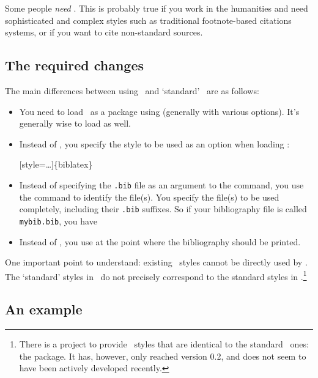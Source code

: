 Some people \emph{need} \biblatex. This is probably true if you work in the humanities and need sophisticated and complex styles such as traditional footnote-based citations systems, or if you want to cite non-standard sources.

\subsection{The required changes}

The main differences between using \biblatex\ and `standard' \bibtex\ are as follows:

\begin{itemize}
\item You need to load \biblatex\ as a package using  (generally with various options). It's generally wise to load  as well.
\item Instead of , you specify the style to be used as an option when loading \biblatex:
\begin{pseudoverb}\centering
{}[style=\ldots]\{biblatex\}
\end{pseudoverb}
\item Instead of specifying the \verb|.bib| file as an argument to the  command, you use the command  to identify the file(s). You specify the file(s) to be used completely, including their \verb|.bib| suffixes. So if your bibliography file is called \verb|mybib.bib|, you have
\begin{pseudoverb}
\centering
{}
\end{pseudoverb}
\item Instead of , you use  at the point where the bibliography should be printed.
\end{itemize}

One important point to understand: existing \bibtex\ styles cannot be directly used by \biblatex. The `standard' styles in \biblatex\ do not precisely correspond to the standard styles in \bibtex.\footnote{There is a project to provide \biblatex\ styles that are identical to the standard \bibtex\ ones: the  package. It has, however, only reached version 0.2, and does not seem to have been actively developed recently.}

\subsection{An example}

